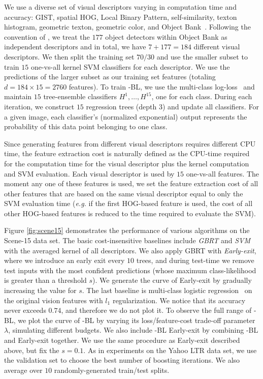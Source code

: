 We use a diverse set of visual descriptors varying in computation time and accuracy: GIST, spatial HOG, Local Binary Pattern, self-similarity, texton histogram, geometric texton, geometric color, and Object Bank~\citep{li2010object}. Following the convention of \citet{li2010object}, we treat the $177$ object detectors within Object Bank as independent descriptors and in total, we have $7 + 177 = 184$ different visual descriptors. We then split the training set $70/30$ and use the smaller subset to train $15$ one-vs-all kernel SVM classifiers for each descriptor. We use the predictions of the larger subset as our training set features (totaling $d\!=\!184\!\times\! 15\!=\!2760$ features). To train \name{}-BL, we use the multi-class log-loss~\citep{trevor2009elements} and maintain $15$ tree-ensemble classifiers $H^1,\dots,H^{15}$, one for each class. During each iteration, we construct $15$ regression trees (depth 3) and update all classifiers. For a given image, each classifier's (normalized exponential) output represents the probability of this data point belonging to one class. 

Since generating features from different visual descriptors requires different CPU time, the feature extraction cost is naturally defined as the CPU-time required for the computation time for the visual descriptor plus the kernel computation and SVM evaluation. Each visual descriptor is used by $15$ one-vs-all features. The moment any one of these features is used, we set the feature extraction cost of all other features that are based on the same visual descriptor equal to only the SVM evaluation time  (\emph{e.g.} if the first HOG-based feature is used, the cost of all other HOG-based features is reduced to the time required to evaluate the SVM). 

Figure \ref{fig:scene15} demonstrates the performance of various algorithms on the Scene-15 data set. The basic cost-insensitive baselines include \emph{GBRT} \citep{friedman2001greedy} and \emph{SVM} with the averaged kernel of all descriptors. We also apply GBRT with \emph{Early-exit}, where we introduce an early exit every $10$ trees, and during test-time we remove test inputs with the most confident predictions (whose maximum class-likelihood is greater than a threshold $s$). We generate the curve of Early-exit by gradually increasing the value for $s$. The last baseline is multi-class logistic regression~\citep{trevor2009elements} on the original vision features with $l_1$ regularization. We notice that its accuracy never exceeds $0.74$, and therefore we do not plot it. To observe the full range of \name{}-BL, we plot the curve of \name{}-BL by varying its loss/feature-cost trade-off parameter $\lambda$, simulating different budgets. We also include \name{}-BL Early-exit by combining \name{}-BL and Early-exit  together. We use the same procedure as Early-exit described above, but fix the $s = 0.1$. As in experiments on the Yahoo LTR data set, we use the validation set to choose the best number of boosting iterations. We also average over $10$ randomly-generated train/test splits.

